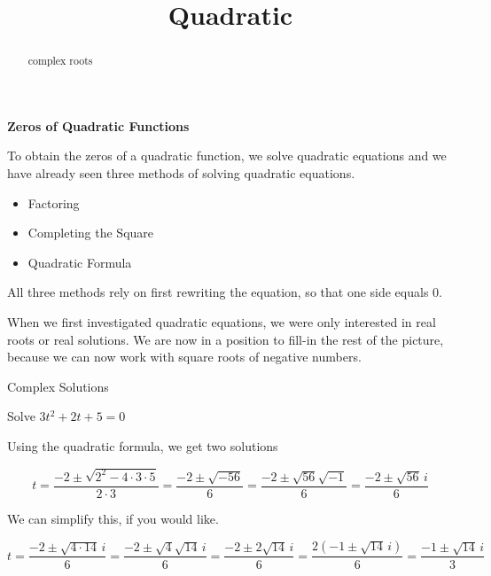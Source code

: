 \documentclass{ximera}
\title{Quadratic}
\begin{document}
\begin{abstract}
complex roots
\end{abstract}
\maketitle



\textbf{\textcolor{blue!55!black}{Zeros of Quadratic Functions}}


To obtain the zeros of a quadratic function, we solve quadratic equations and we have already seen three methods of solving quadratic equations.

\begin{itemize}
	\item Factoring
	\item Completing the Square
	\item Quadratic Formula
	\end{itemize}


All three methods rely on first rewriting the equation, so that one side equals $0$.

When we first investigated quadratic equations, we were only interested in real roots or real solutions.  We are now in a position to fill-in the rest of the picture, because we can now work with square roots of negative numbers.


\begin{example} Complex Solutions

Solve $3t^2 + 2t + 5 = 0$

Using the quadratic formula, we get two solutions

\[  t = \frac{-2 \pm \sqrt{2^2 - 4 \cdot 3 \cdot 5}}{2 \cdot 3}   =  \frac{-2 \pm \sqrt{-56}}{6}  =  \frac{-2 \pm \sqrt{56}\sqrt{-1}}{6}   =  \frac{-2 \pm \sqrt{56} \, i}{6}  \]



We can simplify this, if you would like.


\[  t = \frac{-2 \pm \sqrt{4 \cdot 14} \, i}{6}  = \frac{-2 \pm \sqrt{4} \sqrt{14} \, i}{6} = \frac{-2 \pm 2 \sqrt{14} \, i}{6} = \frac{2(-1 \pm \sqrt{14} \, i)}{6}   = \frac{-1 \pm \sqrt{14} \, i}{3}   \]



\end{example}
\end{document}
